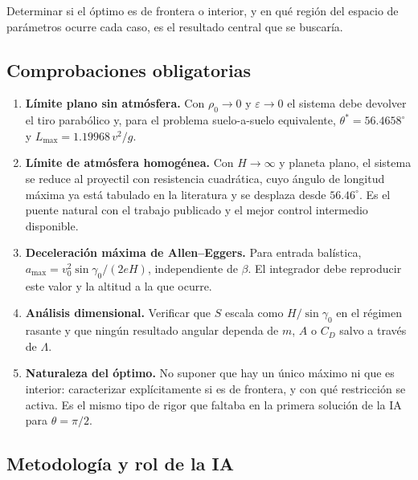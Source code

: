 Determinar si el óptimo es de frontera o interior, y en qué región del espacio de parámetros ocurre cada caso, es el resultado central que se buscaría.

\subsection{Comprobaciones obligatorias}

\begin{enumerate}
    \item \textbf{Límite plano sin atmósfera.} Con \(\rho_0\to0\) y \(\varepsilon\to0\) el sistema debe devolver el tiro parabólico y, para el problema suelo-a-suelo equivalente, \(\theta^*=56.4658^\circ\) y \(L_{\max}=1.19968\,v^2/g\).
    \item \textbf{Límite de atmósfera homogénea.} Con \(H\to\infty\) y planeta plano, el sistema se reduce al proyectil con resistencia cuadrática, cuyo ángulo de longitud máxima ya está tabulado en la literatura y se desplaza desde \(56.46^\circ\). Es el puente natural con el trabajo publicado y el mejor control intermedio disponible.
    \item \textbf{Deceleración máxima de Allen--Eggers.} Para entrada balística, \(a_{\max}=v_0^2\sin\gamma_0/(2eH)\), independiente de \(\beta\). El integrador debe reproducir este valor y la altitud a la que ocurre.
    \item \textbf{Análisis dimensional.} Verificar que \(S\) escala como \(H/\sin\gamma_0\) en el régimen rasante y que ningún resultado angular dependa de \(m\), \(A\) o \(C_D\) salvo a través de \(\Lambda\).
    \item \textbf{Naturaleza del óptimo.} No suponer que hay un único máximo ni que es interior: caracterizar explícitamente si es de frontera, y con qué restricción se activa. Es el mismo tipo de rigor que faltaba en la primera solución de la IA para \(\theta=\pi/2\).
\end{enumerate}

\subsection{Metodología y rol de la IA}

